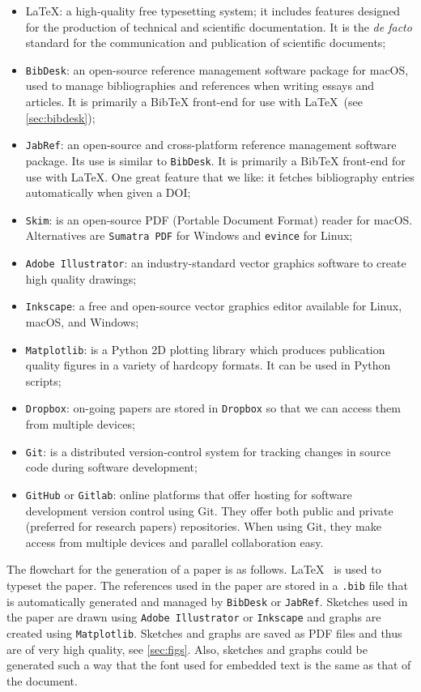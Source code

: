 \documentclass[authoryear,12pta4paper,fleqn]{article}
\numberwithin{equation}{section}
\theoremstyle{remark}
\begin{document}
\begin{itemize}
\item \LaTeX:  a high-quality free typesetting system; it includes features designed for the production of technical and scientific documentation. It is the \textit{de facto} standard for the communication and publication of scientific documents; 
\item \texttt{BibDesk}: an open-source reference management software package for macOS, used to manage bibliographies and references when writing essays and articles. It is primarily a BibTeX front-end for use with \LaTeX\ (see \cref{sec:bibdesk});
\item \texttt{JabRef}:  an open-source and cross-platform reference management software package. Its use is similar to \texttt{BibDesk}. It is primarily a BibTeX front-end for use with \LaTeX. One great feature that we like: it fetches bibliography entries automatically when given a DOI;
\item \texttt{Skim}: is an open-source PDF (Portable Document Format) reader for macOS. Alternatives are \texttt{Sumatra PDF} for Windows and \texttt{evince} for Linux;
\item \texttt{Adobe Illustrator}: an industry-standard vector graphics software to create high quality drawings;
\item \texttt{Inkscape}: a free and open-source vector graphics editor available for Linux, macOS, and Windows;
\item \texttt{Matplotlib}: is a Python 2D plotting library which produces publication quality figures in a variety of hardcopy formats. It can be used in Python scripts;
\item \texttt{Dropbox}: on-going papers are stored in \texttt{Dropbox} so that we can access them from multiple devices;
\item \texttt{Git}: is a distributed version-control system for tracking changes in source code during software development;
\item \texttt{GitHub} or \texttt{Gitlab}: online platforms that offer hosting for software development version control using Git. They offer both public and private (preferred for research papers) repositories. When using Git, they make access from multiple devices and parallel collaboration easy.
\end{itemize}

The flowchart for the generation of a paper is as follows. \LaTeX~ is used to typeset the paper. The references used in the paper are stored in a \texttt{.bib} file that is automatically generated and managed by \texttt{BibDesk} or \texttt{JabRef}. Sketches used in the paper are drawn using \texttt{Adobe Illustrator} or \texttt{Inkscape} and graphs are created using \texttt{Matplotlib}. Sketches and graphs are saved as PDF files and thus are of very high quality, see \cref{sec:figs}. Also, sketches and graphs could be generated such a way that the font used for embedded text is the same as that of the  document.
\end{document}
